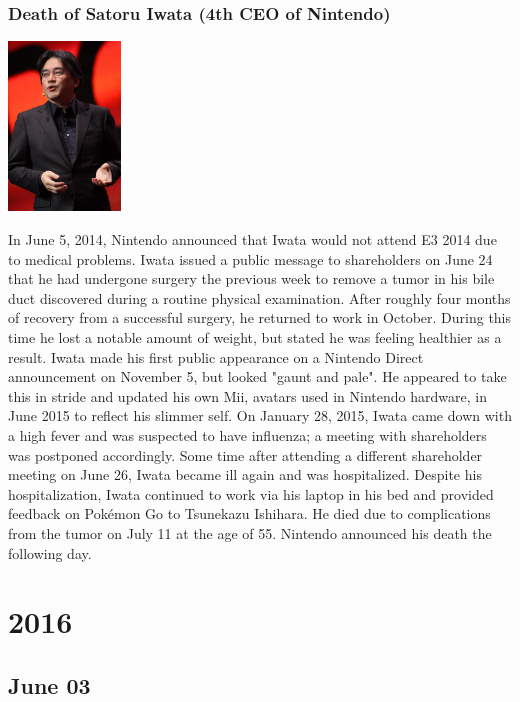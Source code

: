 \documentclass[11pt]{report}
\begin{document}
\subsection{Death of Satoru Iwata (4th CEO of Nintendo)}
\vspace{2mm}\begin{center}\includegraphics[width=3cm]{./img/satoruIwata.jpg}\end{center}
In June 5, 2014, Nintendo announced that Iwata would not attend E3 2014 due to medical problems. Iwata issued a public message to shareholders on June 24 that he had undergone surgery the previous week to remove a tumor in his bile duct discovered during a routine physical examination. After roughly four months of recovery from a successful surgery, he returned to work in October. During this time he lost a notable amount of weight, but stated he was feeling healthier as a result. Iwata made his first public appearance on a Nintendo Direct announcement on November 5, but looked "gaunt and pale". He appeared to take this in stride and updated his own Mii, avatars used in Nintendo hardware, in June 2015 to reflect his slimmer self. On January 28, 2015, Iwata came down with a high fever and was suspected to have influenza; a meeting with shareholders was postponed accordingly. Some time after attending a different shareholder meeting on June 26, Iwata became ill again and was hospitalized. Despite his hospitalization, Iwata continued to work via his laptop in his bed and provided feedback on Pokémon Go to Tsunekazu Ishihara. He died due to complications from the tumor on July 11 at the age of 55. Nintendo announced his death the following day.

\chapter{2016}
\section{June 03}
\end{document}
